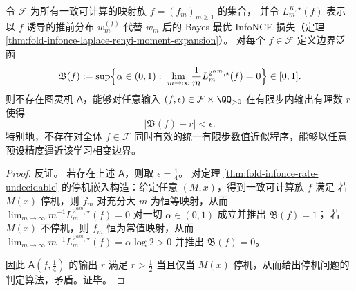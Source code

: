 
\begin{proposition}\label{prop:fold-infonce-boundary-functional-uncomputable}
令 \(\mathcal F\) 为所有一致可计算的映射族 \(f=(f_m)_{m\ge 1}\) 的集合，
并令 \(L_m^{K,\star}(f)\) 表示以 \(f\) 诱导的推前分布 \(w_m^{(f)}\) 代替 \(w_m\) 后的 Bayes 最优 InfoNCE 损失（定理 \ref{thm:fold-infonce-laplace-renyi-moment-expansion}）。
对每个 \(f\in\mathcal F\) 定义边界泛函
\[
\mathfrak B(f)
:=
\sup\Bigl\{\alpha\in(0,1):\ \lim_{m\to\infty}\frac{1}{m}L_m^{2^{\alpha m},\star}(f)=0\Bigr\}\in[0,1].
\]
则不存在图灵机 \(\mathsf A\)，能够对任意输入 \((f,\epsilon)\in\mathcal F\times\QQ_{>0}\) 在有限步内输出有理数 \(r\) 使得
\[
|\mathfrak B(f)-r|<\epsilon.
\]
特别地，不存在对全体 \(f\in\mathcal F\) 同时有效的统一有限步数值近似程序，能够以任意预设精度逼近该学习相变边界。
\end{proposition}

\begin{proof}
反证。
若存在上述 \(\mathsf A\)，则取 \(\epsilon=\tfrac14\)。
对定理 \ref{thm:fold-infonce-rate-undecidable} 的停机嵌入构造：给定任意 \((M,x)\)，得到一致可计算族 \(f\) 满足
若 \(M(x)\) 停机，则 \(f_m\) 对充分大 \(m\) 为恒等映射，从而 \(\lim_{m\to\infty}m^{-1}L_m^{2^{\alpha m},\star}(f)=0\) 对一切 \(\alpha\in(0,1)\) 成立并推出 \(\mathfrak B(f)=1\)；
若 \(M(x)\) 不停机，则 \(f_m\) 恒为常值映射，从而 \(\lim_{m\to\infty}m^{-1}L_m^{2^{\alpha m},\star}(f)=\alpha\log 2>0\) 并推出 \(\mathfrak B(f)=0\)。
\par
因此 \(\mathsf A(f,\tfrac14)\) 的输出 \(r\) 满足 \(r>\tfrac12\) 当且仅当 \(M(x)\) 停机，从而给出停机问题的判定算法，矛盾。证毕。
\end{proof}
